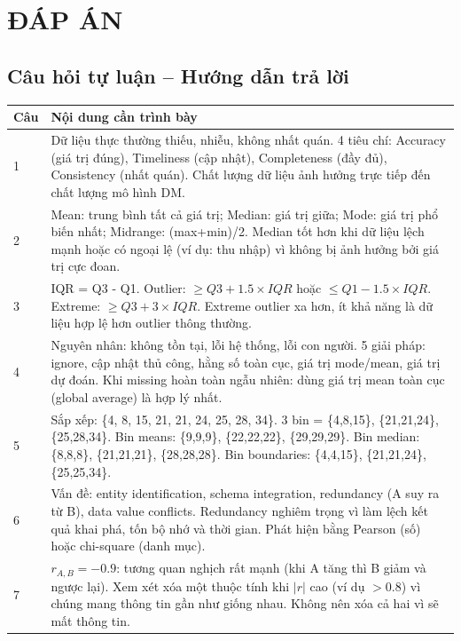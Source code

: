 \documentclass[10pt]{article}
\begin{document}
\newpage
\section*{ĐÁP ÁN}

\subsection*{Câu hỏi tự luận -- Hướng dẫn trả lời}

\begin{singlespace}
\begin{longtable}{|p{}|p{}|}
\hline
\textbf{Câu} & \textbf{Nội dung cần trình bày} \\
\hline
\endhead
1 & Dữ liệu thực thường thiếu, nhiễu, không nhất quán. 4 tiêu chí: Accuracy (giá trị đúng), Timeliness (cập nhật), Completeness (đầy đủ), Consistency (nhất quán). Chất lượng dữ liệu ảnh hưởng trực tiếp đến chất lượng mô hình DM. \\
\hline
2 & Mean: trung bình tất cả giá trị; Median: giá trị giữa; Mode: giá trị phổ biến nhất; Midrange: (max+min)/2. Median tốt hơn khi dữ liệu lệch mạnh hoặc có ngoại lệ (ví dụ: thu nhập) vì không bị ảnh hưởng bởi giá trị cực đoan. \\
\hline
3 & IQR = Q3 - Q1. Outlier: $\geq Q3 + 1.5 \times IQR$ hoặc $\leq Q1 - 1.5 \times IQR$. Extreme: $\geq Q3 + 3 \times IQR$. Extreme outlier xa hơn, ít khả năng là dữ liệu hợp lệ hơn outlier thông thường. \\
\hline
4 & Nguyên nhân: không tồn tại, lỗi hệ thống, lỗi con người. 5 giải pháp: ignore, cập nhật thủ công, hằng số toàn cục, giá trị mode/mean, giá trị dự đoán. Khi missing hoàn toàn ngẫu nhiên: dùng giá trị mean toàn cục (global average) là hợp lý nhất. \\
\hline
5 & Sắp xếp: \{4, 8, 15, 21, 21, 24, 25, 28, 34\}. 3 bin = \{4,8,15\}, \{21,21,24\}, \{25,28,34\}. Bin means: \{9,9,9\}, \{22,22,22\}, \{29,29,29\}. Bin median: \{8,8,8\}, \{21,21,21\}, \{28,28,28\}. Bin boundaries: \{4,4,15\}, \{21,21,24\}, \{25,25,34\}. \\
\hline
6 & Vấn đề: entity identification, schema integration, redundancy (A suy ra từ B), data value conflicts. Redundancy nghiêm trọng vì làm lệch kết quả khai phá, tốn bộ nhớ và thời gian. Phát hiện bằng Pearson (số) hoặc chi-square (danh mục). \\
\hline
7 & $r_{A,B} = -0.9$: tương quan nghịch rất mạnh (khi A tăng thì B giảm và ngược lại). Xem xét xóa một thuộc tính khi $|r|$ cao (ví dụ $> 0.8$) vì chúng mang thông tin gần như giống nhau. Không nên xóa cả hai vì sẽ mất thông tin. \\

\end{longtable}
\end{singlespace}
\end{document}
